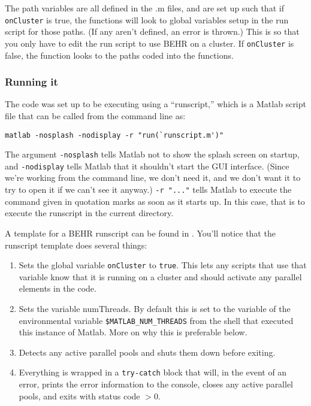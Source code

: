 \documentclass[12pt]{article}
\begin{document}
		The path variables are all defined in the .m files, and are set up such that if \texttt{onCluster} is true, the functions will look to global variables setup in the run script for those paths. (If any aren't defined, an error is thrown.)  This is so that you only have to edit the run script to use BEHR on a cluster.  If \texttt{onCluster} is false, the function looks to the paths coded into the functions.

	\subsubsection{Running it}
		The code was set up to be executing using a ``runscript,'' which is a Matlab script file that can be called from the command line as:
\begin{lstlisting}
matlab -nosplash -nodisplay -r "run(`runscript.m')"
\end{lstlisting}
		The argument \texttt{-nosplash} tells Matlab not to show the splash screen on startup, and \texttt{-nodisplay} tells Matlab that it shouldn't start the GUI interface. (Since we're working from the command line, we don't need it, and we don't want it to try to open it if we can't see it anyway.) \texttt{-r "..."} tells Matlab to execute the command given in quotation marks as soon as it starts up.  In this case, that is to execute the runscript in the current directory.
		
		A template for a BEHR runscript can be found in . You'll notice that the runscript template does several things:
		\begin{enumerate}
			\item Sets the global variable \texttt{onCluster} to \texttt{true}.  This lets any scripts that use that variable know that it is running on a cluster and should activate any parallel elements in the code.
			\item Sets the variable numThreads.  By default this is set to the variable of the environmental variable \texttt{\$MATLAB\_NUM\_THREADS} from the shell that executed this instance of Matlab. More on why this is preferable below.
			\item Detects any active parallel pools and shuts them down before exiting.
			\item Everything is wrapped in a \texttt{try-catch} block that will, in the event of an error, prints the error information to the console, closes any active parallel pools, and exits with status code $> 0$.
		\end{enumerate}
\end{document}
